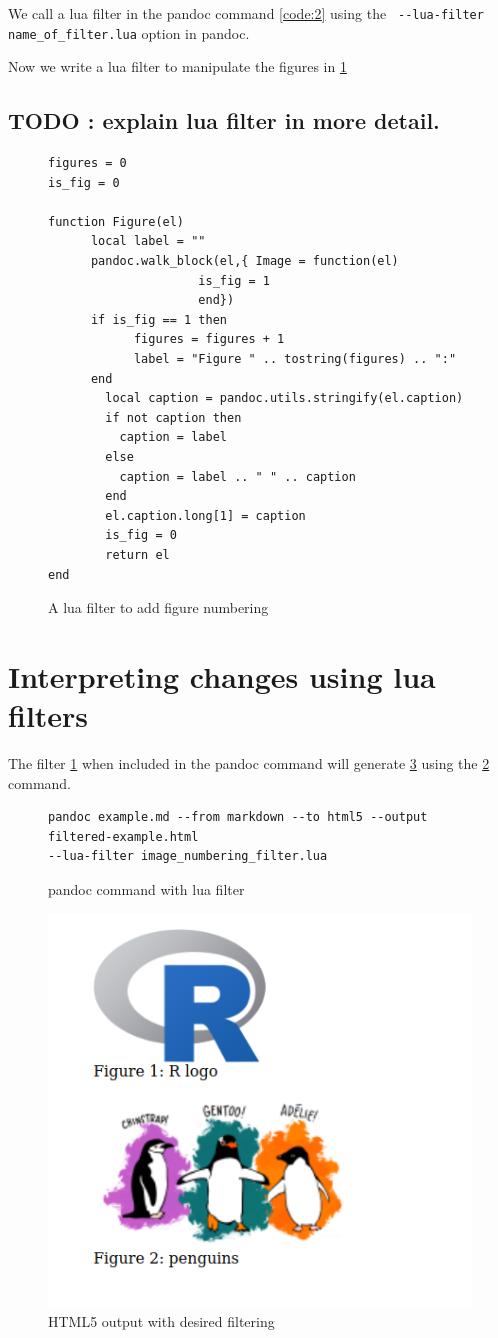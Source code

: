 We call a lua filter in the pandoc command \ref{code:2} using the \verb| --lua-filter name_of_filter.lua|
option in pandoc.

Now we write a lua filter to manipulate the figures in \ref{code:3}
\subsection{TODO : explain lua filter in more detail.}
\begin{figure}[htbp]
\begin{verbatim}
figures = 0
is_fig = 0

function Figure(el)
      local label = ""
      pandoc.walk_block(el,{ Image = function(el)
                     is_fig = 1
                     end})
      if is_fig == 1 then
	        figures = figures + 1
	        label = "Figure " .. tostring(figures) .. ":"
      end
	    local caption = pandoc.utils.stringify(el.caption)
	    if not caption then
          caption = label
    	else
          caption = label .. " " .. caption
    	end
    	el.caption.long[1] = caption
    	is_fig = 0
    	return el
end
\end{verbatim}
\caption{A lua filter to add figure numbering}
\label{code:3}
\end{figure}

\section{Interpreting changes using lua filters}

The filter \ref{code:3} when included in the pandoc command will generate \ref{fig:2} 
using the \ref{code:4} command.

\begin{figure}[htbp]
\begin{verbatim}
pandoc example.md --from markdown --to html5 --output filtered-example.html
--lua-filter image_numbering_filter.lua
\end{verbatim}
\caption{pandoc command with lua filter}
\label{code:4}
\end{figure}

\begin{figure}[htbp]
\centering
\includegraphics[width=0.5\linewidth]{example-filtered.png}
\caption{HTML5 output with desired filtering}
\label{fig:2}
\end{figure}

